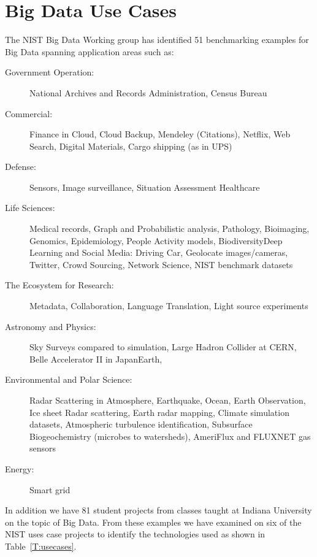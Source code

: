 \section{Big Data Use Cases}\label{S:usecases}

The NIST Big Data Working group has identified 51 benchmarking examples for Big Data\cite{??} spanning application areas such as:

\begin{description}

\item[Government Operation:] National Archives and Records
  Administration, Census Bureau

\item[Commercial:] Finance in Cloud, Cloud Backup, Mendeley
  (Citations), Netflix, Web Search, Digital Materials, Cargo shipping
  (as in UPS)

\item[Defense:] Sensors, Image surveillance, Situation Assessment
  Healthcare

\item[Life Sciences:] Medical records, Graph and Probabilistic
  analysis, Pathology, Bioimaging, Genomics, Epidemiology, People
  Activity models, BiodiversityDeep Learning and Social Media: Driving
  Car, Geolocate images/cameras, Twitter, Crowd Sourcing, Network
  Science, NIST benchmark datasets

\item[The Ecosystem for Research:] Metadata, Collaboration, Language
  Translation, Light source experiments

\item[Astronomy and Physics:] Sky Surveys compared to simulation,
  Large Hadron Collider at CERN, Belle Accelerator II in JapanEarth,

\item[Environmental and Polar Science:] Radar Scattering in
  Atmosphere, Earthquake, Ocean, Earth Observation, Ice sheet Radar
  scattering, Earth radar mapping, Climate simulation datasets,
  Atmospheric turbulence identification, Subsurface Biogeochemistry
  (microbes to watersheds), AmeriFlux and FLUXNET gas sensors

\item[Energy:] Smart grid

\end{description}

In addition we have 81 student projects from classes taught at Indiana University on the topic of Big Data. 
From these examples we have examined on six of the NIST uses case projects to identify the technologies used as shown in Table~\ref{T:usecases}.

